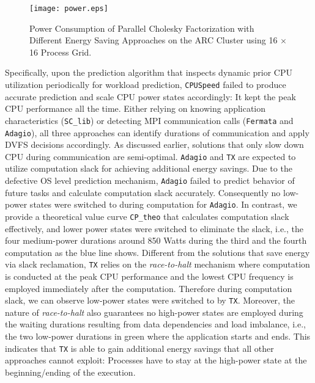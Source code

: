 \documentclass[12pt]{elsarticle}
\begin{document}
\begin{figure}\centering
\texttt{[image: power.eps]}\caption{Power Consumption of Parallel Cholesky Factorization with Different Energy Saving Approaches on the ARC Cluster using 16 $\times$ 16 Process Grid.}
\label{power_efficiency_arc}
\end{figure}

Specifically, upon the prediction algorithm that inspects dynamic prior CPU utilization periodically for workload prediction, \texttt{CPUSpeed} failed to produce accurate prediction and scale CPU power states accordingly: It kept the peak CPU performance all the time. Either relying on knowing application characteristics (\texttt{SC\_lib}) or detecting MPI communication calls (\texttt{Fermata} and \texttt{Adagio}), all three approaches can identify durations of communication and apply DVFS decisions accordingly. As discussed earlier, solutions that only slow down CPU during communication are semi-optimal. \texttt{Adagio} and \texttt{TX} are expected to utilize computation slack for achieving additional energy savings. Due to the defective OS level prediction mechanism, \texttt{Adagio} failed to predict behavior of future tasks and calculate computation slack accurately. Consequently no low-power states were switched to during computation for \texttt{Adagio}. In contrast, we provide a theoretical value curve \texttt{CP\_theo} that calculates computation slack effectively, and lower power states were switched to eliminate the slack, i.e., the four medium-power durations around 850 Watts during the third and the fourth computation as the blue line shows. Different from the solutions that save energy via slack reclamation, \texttt{TX} relies on the \emph{race-to-halt} mechanism where computation is conducted at the peak CPU performance and the lowest CPU frequency is employed immediately after the computation. Therefore during computation slack, we can observe low-power states were switched to by \texttt{TX}. Moreover, the nature of \emph{race-to-halt} also guarantees no high-power states are employed during the waiting durations resulting from data dependencies and load imbalance, i.e., the two low-power durations in green where the application starts and ends. This indicates that \texttt{TX} is able to gain additional energy savings that all other approaches cannot exploit: Processes have to stay at the high-power state at the beginning/ending of the execution.
\end{document}
